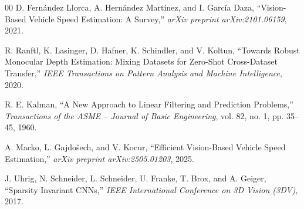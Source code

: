 \documentclass[conference]{IEEEtran}
\begin{document}
\begin{thebibliography}{00}
D. Fern\'andez Llorca, A. Hern\'andez Mart\'inez, and I. Garc\'ia Daza,
``Vision-Based Vehicle Speed Estimation: A Survey,''
\textit{arXiv preprint arXiv:2101.06159}, 2021.

R. Ranftl, K. Lasinger, D. Hafner, K. Schindler, and V. Koltun,
``Towards Robust Monocular Depth Estimation: Mixing Datasets for
Zero-Shot Cross-Dataset Transfer,''
\textit{IEEE Transactions on Pattern Analysis and Machine Intelligence},
2020.

R. E. Kalman,
``A New Approach to Linear Filtering and Prediction Problems,''
\textit{Transactions of the ASME -- Journal of Basic Engineering},
vol. 82, no. 1, pp. 35--45, 1960.

A. Macko, L. Gajdo\v{s}ech, and V. Kocur,
``Efficient Vision-Based Vehicle Speed Estimation,''
\textit{arXiv preprint arXiv:2505.01203}, 2025.

J. Uhrig, N. Schneider, L. Schneider, U. Franke, T. Brox, and A. Geiger,
``Sparsity Invariant CNNs,''
\textit{IEEE International Conference on 3D Vision (3DV)}, 2017.

\end{thebibliography}
\end{document}
